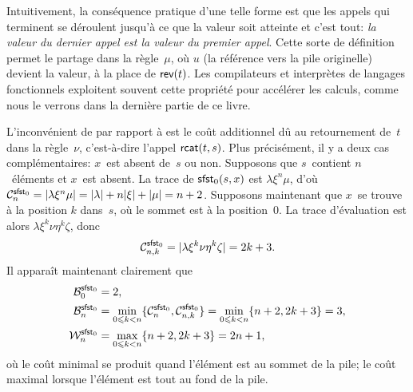 Intuitivement, la conséquence pratique d'une telle forme est que les
appels qui terminent se déroulent jusqu'à ce que la valeur soit
atteinte et c'est tout: \emph{la valeur du dernier appel est la valeur
du premier appel}. Cette sorte de définition permet le partage dans la
règle~\(\mu\), où \(u\) (la référence vers la pile originelle) devient
la valeur, à la place de \(\fun{rev}(t)\). Les compilateurs et
interprètes de langages fonctionnels exploitent souvent cette
propriété pour accélérer les calculs, comme nous le verrons dans la
dernière partie de ce livre.

L'inconvénient de  par rapport à  est le
coût additionnel dû au retournement de~\(t\) dans la règle~\(\nu\),
c'est-à-dire l'appel \(\fun{rcat}(t,s)\). Plus précisément, il y a
deux cas complémentaires: \(x\)~est absent de~\(s\) ou non. Supposons
que \(s\)~contient \(n\)~éléments et \(x\)~est absent. La trace
 de \(\fun{sfst}_0(s,x)\)
est \(\lambda\xi^n\mu\), d'où \(\C{\fun{sfst}_0}{n} =
\len{\lambda\xi^n\mu} = \len{\lambda} + n \len{\xi} + \len{\mu} = n +
2\). Supposons maintenant que \(x\)~se trouve à la position \(k\)
dans~\(s\), où le sommet est à la position~\(0\). La trace
d'évaluation est alors \(\lambda \xi^{k}\nu\eta^k\zeta\), donc
\begin{equation*}
  \C{\fun{sfst}_0}{n,k} = \len{\lambda \xi^{k}\nu\eta^k\zeta} = 2k + 3.
\end{equation*}
Il apparaît maintenant clairement que
\begin{align*}
\B{\fun{sfst}_0}{0} & = 2,\\
\B{\fun{sfst}_0}{n} & = \min_{0 \leqslant k < n}\{\C{\fun{sfst}_0}{n}, \C{\fun{sfst}_0}{n,k}\}
                    = \min_{0 \leqslant k < n}\{n+2,2k+3\} = 3,\\
\W{\fun{sfst}_0}{n} & = \max_{0 \leqslant k < n}\{n+2,2k+3\} = 2n+1,
\end{align*}
où le coût minimal se produit quand l'élément est au sommet de la
pile; le coût maximal lorsque l'élément est tout au fond de la pile.

